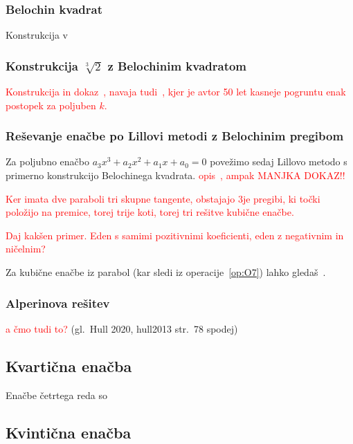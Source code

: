 \subsubsection{Belochin kvadrat}
Konstrukcija v~\cite[str.\ 309]{hull2011}

\subsubsection*{Konstrukcija $\sqrt[3]{2}$ z Belochinim kvadratom}
\label{podpogl:beloch_kvadrat_koren}

\textcolor{red}{Konstrukcija in dokaz~\cite[str.\ 310]{hull2011}, navaja tudi~\cite[str.\ 156]{geometricconstructions}, kjer je avtor 50 let kasneje pogruntu enak postopek za poljuben $k$.}

\subsubsection{Reševanje enačbe po Lillovi metodi z Belochinim pregibom}

Za poljubno enačbo $a_3 x^3 + a_2 x^2 + a_1 x + a_0 = 0$ povežimo sedaj Lillovo metodo s primerno konstrukcijo Belochinega kvadrata. \textcolor{red}{opis~\cite[str.\ 312]{hull2011}, ampak MANJKA DOKAZ!!}

\textcolor{red}{Ker imata dve paraboli tri skupne tangente, obstajajo 3je pregibi, ki točki položijo na premice, torej trije koti, torej tri rešitve kubične enačbe.}

\textcolor{red}{Daj kakšen primer. Eden s samimi pozitivnimi koeficienti, eden z negativnim in ničelnim?}


Za kubične enačbe iz parabol (kar sledi iz operacije~\ref{op:O7}) lahko gledaš~\cite[str.\ 150]{geometricconstructions}.

\subsubsection{Alperinova rešitev}

\textcolor{red}{a čmo tudi to?} (gl.\ Hull 2020, hull2013 str.\ 78 spodej)

\subsection{Kvartična enačba}

Enačbe četrtega reda so 


\subsection{Kvintična enačba}
